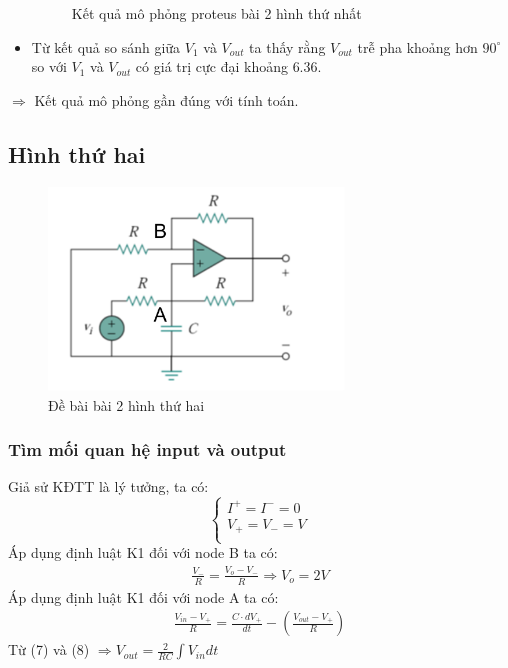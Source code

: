 \begin{itemize}
\begin{figure}[H]
                    \caption{Kết quả mô phỏng proteus bài 2 hình thứ nhất}
                \end{figure}
                \item Từ kết quả so sánh giữa $V_{1}$ và $V_{out}$ ta thấy rằng $V_{out}$ trễ pha khoảng hơn $90^\circ$ so với $V_{1}$ và $V_{out}$ có giá trị cực đại khoảng $6.36$.
            \end{itemize}
            \hspace*{0.6cm}$\Rightarrow$ Kết quả mô phỏng gần đúng với tính toán.
    \subsection{Hình thứ hai}
        \begin{figure}[H]
            \centering
            \includegraphics[width=0.7\textwidth]{pictures/topic2_b.png}
            \caption{Đề bài bài 2 hình thứ hai}					
            \label{fig:circuit_simulation}
        \end{figure}
        \subsubsection{Tìm mối quan hệ input và output}
            \hspace*{0.6cm}Giả sử KĐTT là lý tưởng, ta có:
            \[
				\begin{cases}
					I^+ = I^- = 0\\
					V_{+} = V_{-} = V\\
				\end{cases}
			\]
            \hspace*{0.6cm}Áp dụng định luật K1 đối với node B ta có: 
            \begin{align}
                \frac{V_{-}}{R} = \frac{V_{o} - V_{-}}{R} \Rightarrow V_{o}= 2V
            \end{align}
            \hspace*{0.6cm}Áp dụng định luật K1 đối với node A ta có:
            \begin{align}
                \frac{V_{in} - V_{+}}{R} = \frac{C \cdot dV_{+}}{dt} - (\frac{V_{out} - V_{+}}{R}) 
            \end{align}
            \hspace{0.6cm}Từ (7) và (8) $\Rightarrow V_{out} = \frac{2}{RC} \int V_{in} dt$ \\
